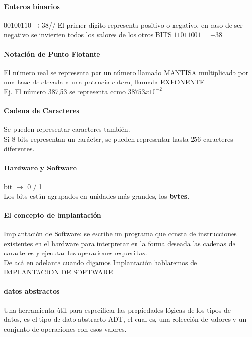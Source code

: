 \documentclass[10pt]{article}
\begin{document}
\paragraph{Enteros binarios}
$00100110 \rightarrow 38$//
\linebreak
El primer dígito representa positivo o negativo, en caso de ser
negativo se invierten todos los valores de los otros BITS
$11011001 = -38$
\paragraph{Notación de Punto Flotante}

El número real se representa por un número llamado MANTISA
multiplicado por una base de elevada a una potencia entera,
llamada EXPONENTE.\\
Ej. El número 387,53 se representa como $38753 x 10^{-2}$

\paragraph{Cadena de Caracteres}
Se pueden representar caracteres también.\\
Si 8 bits representan un carácter, se pueden representar hasta 256
caracteres diferentes.
\paragraph{Hardware y Software}
bit $\rightarrow$ 0 / 1\\
Los bits están agrupados en unidades más grandes, los
\textbf{bytes}.

\paragraph{El concepto de implantación}
Implantación de Software: se escribe un programa que
consta de instrucciones existentes en el hardware para
interpretar en la forma deseada las cadenas de
caracteres y ejecutar las operaciones requeridas.\\
De acá en adelante cuando digamos Implantación
hablaremos de IMPLANTACION DE SOFTWARE.\\

\paragraph{datos abstractos}
Una herramienta útil para especificar las propiedades lógicas de los
tipos de datos, es el tipo de dato abstracto ADT, el cual es, una
colección de valores y un conjunto de operaciones con esos
valores.
\end{document}
